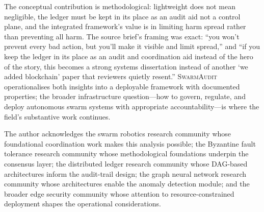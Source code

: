 \documentclass[sigconf,nonacm]{acmart}
\begin{document}
The conceptual contribution is methodological: lightweight does
not mean negligible, the ledger must be kept in its place as an
audit aid not a control plane, and the integrated framework's
value is in limiting harm spread rather than preventing all harm.
The source brief's framing was exact: ``you won't prevent every
bad action, but you'll make it visible and limit spread,'' and
``if you keep the ledger in its place as an audit and coordination
aid instead of the hero of the story, this becomes a strong
systems dissertation instead of another `we added blockchain'
paper that reviewers quietly resent.''
\textsc{SwarmAudit} operationalises both insights into a
deployable framework with documented properties; the broader
infrastructure question---how to govern, regulate, and deploy
autonomous swarm systems with appropriate accountability---is
where the field's substantive work continues.

\begin{acks}
The author acknowledges the swarm robotics research community
whose foundational coordination work makes this analysis possible;
the Byzantine fault tolerance research community whose
methodological foundations underpin the consensus layer; the
distributed ledger research community whose DAG-based
architectures inform the audit-trail design; the graph neural
network research community whose architectures enable the anomaly
detection module; and the broader edge security community whose
attention to resource-constrained deployment shapes the
operational considerations.
\end{acks}
\end{document}
